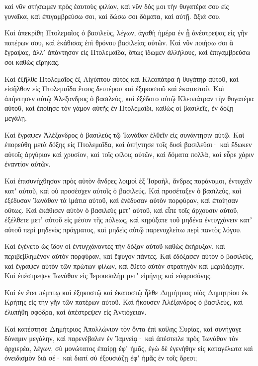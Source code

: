 {καὶ νῦν στήσωμεν πρὸς ἑαυτοὺς φιλίαν, καὶ νῦν δός μοι τὴν θυγατέρα σου εἰς γυναῖκα, καὶ ἐπιγαμβρεύσω σοι, καὶ δώσω σοι δόματα, καὶ αὐτῇ. ἄξιά σου.
\par }{\PP {}Καὶ ἀπεκρίθη Πτολεμαῖος ὁ βασιλεὺς, λέγων, ἀγαθὴ ἡμέρα ἐν ᾗ ἀνέστρεψας εἰς γῆν πατέρων σου, καὶ ἐκάθισας ἐπὶ θρόνου βασιλείας αὐτῶν.
Καὶ νῦν ποιήσω σοι ἃ ἔγραψας, ἀλλʼ ἀπάντησον εἰς Πτολεμαΐδα, ὅπως ἴδωμεν ἀλλήλους, καὶ ἐπιγαμβρεύσω σοι καθὼς εἴρηκας.
\par }{\PP {}Καὶ ἐξῆλθε Πτολεμαῖος ἐξ Αἰγύπτου αὐτὸς καὶ Κλεοπάτρα ἡ θυγάτηρ αὐτοῦ, καὶ εἰσῆλθον εἰς Πτολεμαΐδα ἔτους δευτέρου καὶ ἑξηκοστοῦ καὶ ἑκατοστοῦ.
Καὶ ἀπήντησεν αὐτῷ Ἀλεξανδρος ὁ βασιλεὺς, καὶ ἐξέδοτο αὐτῷ Κλεοπάτραν τὴν θυγατέρα αὐτοῦ, καὶ ἐποίησε τὸν γάμον αὐτῆς ἐν Πτολεμαΐδι, καθὼς οἱ βασιλεῖς, ἐν δόξῃ μεγάλῃ.
\par }{\PP {}Καὶ ἔγραψεν Ἀλέξανδρος ὁ βασιλεὺς τῷ Ἰωνάθαν ἐλθεῖν εἰς συνάντησιν αὐτῷ.
Καὶ ἐπορεύθη μετὰ δόξης εἰς Πτολεμαΐδα, καὶ ἀπήντησε τοῖς δυσὶ βασιλεῦσι· καὶ ἔδωκεν αὐτοῖς ἀργύριον καὶ χρυσίον, καὶ τοῖς φίλοις αὐτῶν, καὶ δόματα πολλὰ, καὶ εὗρε χάριν ἐναντίον αὐτῶν.
\par }{\PP {}Καὶ ἐπισυνήχθησαν πρὸς αὐτὸν ἄνδρες λοιμοὶ ἐξ Ἰσραὴλ, ἄνδρες παράνομοι, ἐντυχεῖν κατʼ αὐτοῦ, καὶ οὐ προσέσχεν αὐτοῖς ὁ βασιλεύς.
Καὶ προσέταξεν ὁ βασιλεὺς, καὶ ἐξέδυσαν Ἰωνάθαν τὰ ἱμάτια αὐτοῦ, καὶ ἐνέδυσαν αὐτὸν πορφύραν, καὶ ἐποίησαν οὕτως.
Καὶ ἐκάθισεν αὐτὸν ὁ βασιλεὺς μετʼ αὐτοῦ, καὶ εἶπε τοῖς ἄρχουσιν αὐτοῦ, ἐξέλθετε μετʼ αὐτοῦ εἰς μέσον τῆς πόλεως, καὶ κηρύξατε τοῦ μηδένα ἐντυγχάνειν κατʼ αὐτοῦ περὶ μηδενὸς πράγματος, καὶ μηδεὶς αὐτῷ παρενοχλείτω περὶ παντὸς λόγου.
\par }{\PP {}Καὶ ἐγένετο ὡς ἴδον οἱ ἐντυγχάνοντες τὴν δόξαν αὐτοῦ καθὼς ἐκήρυξαν, καὶ περιβεβλημένον αὐτὸν πορφύραν, καὶ ἔφυγον πάντες.
Καὶ ἐδόξασεν αὐτὸν ὁ βασιλεύς, καὶ ἔγραψεν αὐτὸν τῶν πρώτων φίλων, καὶ ἔθετο αὐτὸν στρατηγὸν καὶ μεριδάρχην.
Καὶ ἐπέστρεψεν Ἰωνάθαν εἰς Ἱερουσαλὴμ μετʼ εἰρήνης καὶ εὐφροσύνης.
\par }{\PP {}Καί ἐν ἔτει πέμπτῳ καὶ ἑξηκοστῷ καὶ ἑκατοστῷ ἦλθε Δημήτριος υἱὸς Δημητρίου ἐκ Κρήτης εἰς τὴν γῆν τῶν πατέρων αὐτοῦ.
Καὶ ἤκουσεν Ἀλέξανδρος ὁ βασιλεὺς, καὶ ἐλυπήθη σφόδρα, καὶ ἀπέστρεψεν εἰς Ἀντιόχειαν.
\par }{\PP {}Καὶ κατέστησε Δημήτριος Ἀπολλώνιον τὸν ὄντα ἐπὶ κοίλης Συρίας, καὶ συνήγαγε δύναμιν μεγάλην, καὶ παρενέβαλεν ἐν Ἰαμνείᾳ·
καὶ ἀπέστειλε πρὸς Ἰωνάθαν τὸν ἀρχιερέα, λέγων, σὺ μονώτατος ἐπαίρῃ ἐφʼ ἡμᾶς, ἐγὼ δὲ ἐγενήθην εἰς καταγέλωτα καὶ ὀνειδισμὸν διὰ σέ· καὶ διατί σὺ ἐξουσιάζῃ ἐφʼ ἡμᾶς ἐν τοῖς ὄρεσι;
}
